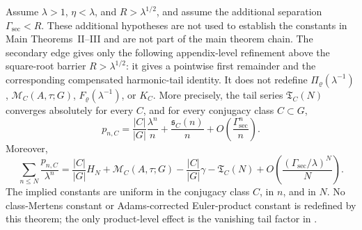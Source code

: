 \begin{theorem}
  \label{thm:class-mertens-secondary-term}
  \label{prop:class-mertens-secondary-term}
  Assume \(\lambda>1\), \(\eta<\lambda\), and \(R>\lambda^{1/2}\), and assume
  the additional separation \(\Gamma_{\mathrm{sec}}<R\).  These additional
  hypotheses are not used to establish the constants in Main
  Theorems~II--III and are not part of the main theorem chain.  The
  secondary edge gives only the
  following appendix-level refinement above the square-root barrier
  \(R>\lambda^{1/2}\): it gives a pointwise first remainder and the
  corresponding compensated harmonic-tail identity.  It does not redefine
  \(\Pi_\varrho(\lambda^{-1})\), \(\mathcal M_C(A,\tau;G)\),
  \(F_\varrho(\lambda^{-1})\), or \(K_C\).  More precisely, the
  tail series \(\mathfrak T_C(N)\) converges absolutely for every \(C\), and
  for every conjugacy class \(C\subset G\),
  \begin{equation}\label{eq:class-secondary-pointwise}
    p_{n,C}
    =
    \frac{|C|}{|G|}\frac{\lambda^n}{n}
    +\frac{\mathfrak s_C(n)}{n}
    +O\!\left(\frac{\Gamma_{\mathrm{sec}}^n}{n}\right).
  \end{equation}
  Moreover,
  \begin{equation}\label{eq:class-secondary-harmonic}
    \sum_{n\le N}\frac{p_{n,C}}{\lambda^n}
    =
    \frac{|C|}{|G|}H_N
    +\mathcal M_C(A,\tau;G)-\frac{|C|}{|G|}\gamma
    -\mathfrak T_C(N)
    +O\!\left(\frac{(\Gamma_{\mathrm{sec}}/\lambda)^N}{N}\right).
  \end{equation}
  The implied constants are uniform in the conjugacy class \(C\), in
  \(n\), and in \(N\).  No class-Mertens constant or Adams-corrected
  Euler-product constant is redefined by this theorem; the only
  product-level effect is the vanishing tail factor in
  .
\end{theorem}

